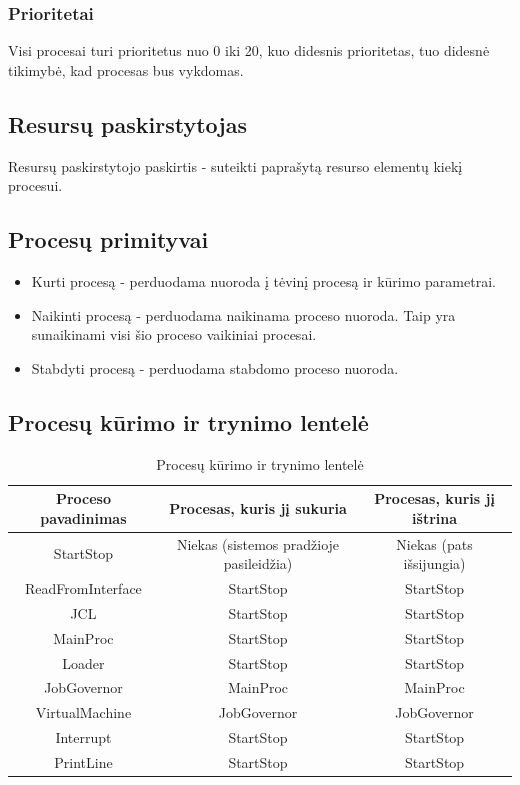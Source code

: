 \documentclass{VUMIFInfKursinis}
\begin{document}
\subsubsection{Prioritetai}

Visi procesai turi prioritetus nuo 0 iki 20, kuo didesnis prioritetas, tuo didesnė tikimybė, kad procesas bus vykdomas.

\subsection{Resursų paskirstytojas}

Resursų paskirstytojo paskirtis - suteikti paprašytą resurso elementų kiekį procesui.

\subsection{Procesų primityvai}

\begin{itemize}
	\item Kurti procesą - perduodama nuoroda į tėvinį procesą ir kūrimo parametrai.
	\item Naikinti procesą - perduodama naikinama proceso nuoroda. Taip yra sunaikinami visi šio proceso vaikiniai procesai.
	\item Stabdyti procesą - perduodama stabdomo proceso nuoroda.
\end{itemize}

\subsection{Procesų kūrimo ir trynimo lentelė}

\begin{table}[H]\footnotesize
	\centering
	\caption{Procesų kūrimo ir trynimo lentelė}    %
	\begin{tabular}{|c|c|c|}
		\hline
		Proceso pavadinimas & Procesas, kuris jį sukuria & Procesas, kuris jį ištrina \\
		\hline
		StartStop & Niekas (sistemos pradžioje pasileidžia) & Niekas (pats išsijungia) \\
		\hline
		ReadFromInterface & StartStop & StartStop\\
		\hline
		JCL & StartStop & StartStop \\
		\hline
		MainProc & StartStop & StartStop \\
		\hline
		Loader & StartStop & StartStop \\
		\hline
		JobGovernor & MainProc & MainProc \\
		\hline
		VirtualMachine & JobGovernor & JobGovernor \\
		\hline
		Interrupt & StartStop & StartStop \\
		\hline
		PrintLine & StartStop & StartStop \\
		\hline
	\end{tabular}
	\label{tab:duomenys}
\end{table}
\end{document}
